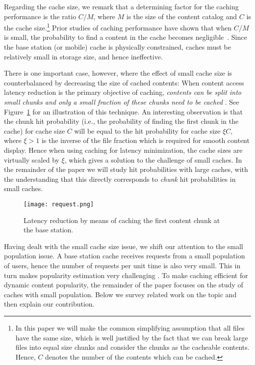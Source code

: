 \documentclass[10pt, conference, letterpaper]{IEEEtran}
\newcommand{\spyros}[1]{{#1}}
\begin{document}
Regarding the cache size, we remark that 
a determining factor for the caching performance is the ratio $C/M$, where $M$ is the size of the content catalog and $C$ is the cache size.\footnote{In this paper we will make the common simplifying assumption that all files have the same size\spyros {, which is well justified by the fact that we can break large files into equal size chunks and consider the chunks as the cacheable contents}. Hence, $C$ denotes the number of the contents which can be cached.} 
Prior studies of caching performance have shown that when $C/M$ is small, the probability to find a content in the cache becomes negligible~\cite{Roberts13}.
Since the base station (or mobile) cache is physically constrained, caches must be relatively small in storage size, and hence ineffective. 

 
\spyros {There is one important case, however, where the effect of small cache size is counterbalanced by decreasing the size of cached contents: When content access latency reduction is the primary objective of caching, \emph{contents can be split into small chunks and only a small fraction of these chunks need to be cached}} \cite{Sen99}. 
See Figure~\ref{fig:request} for an illustration of this technique.
An interesting observation is that the chunk hit probability (i.e., the probability of finding the first chunk in the cache) for cache size $C$  will be equal to the hit probability for cache size $\xi C$, where $\xi>1$ is the inverse of the file fraction which is required for smooth content display. Hence when using caching for latency minimization, the cache sizes are virtually scaled by $\xi$, which gives a solution to the challenge of small caches. In the remainder of the paper we will study  hit probabilities with large caches, with the understanding that this directly corresponds to  \emph{chunk} hit probabilities in small caches.

\begin{figure}[t]
      \centering
            \texttt{[image: request.png]}
						\vspace{-0.15in} 
      \caption{Latency reduction by means of caching the first content chunk at the base station.}\vspace{-0.4in}
			\label{fig:request}
\end{figure}


Having dealt with the small cache size issue, we shift our attention to the small population issue.
A base station cache receives requests from a small population of users, hence the number of requests per unit time is also very small. This in turn makes popularity estimation very challenging \cite{5Gcaching}. 
To make caching efficient for dynamic content popularity, 
the remainder of the paper 
focuses on the study of  
caches with small population.
Below we survey related work on the topic and then explain our contribution.
\end{document}
